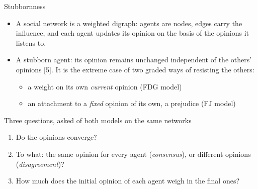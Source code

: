 \documentclass[10pt, aspectratio=169]{beamer}
\begin{document}
\begin{frame}[label=m-question]{Stubbornness}
  \begin{itemize}
    \item A social network is a weighted digraph: agents are nodes, edges carry the
          influence, and each agent updates its opinion on the basis of the opinions it
          listens to.
    \item A \alert{stubborn} agent: its opinion remains unchanged independent of the
          others' opinions [5]. It is the extreme case of two graded ways of resisting
          the others:
          \begin{itemize}
            \item a weight on its own \emph{current} opinion \hfill (FDG model)
            \item an attachment to a \emph{fixed} opinion of its own, a prejudice
                  \hfill (FJ model)
          \end{itemize}
  \end{itemize}
  \vspace{3mm}
  \begin{alertblock}{Three questions, asked of both models on the same networks}
    \begin{enumerate}
      \item Do the opinions converge?
      \item To what: the same opinion for every agent (\emph{consensus}), or different
            opinions (\emph{disagreement})?
      \item How much does the initial opinion of each agent weigh in the final ones?
    \end{enumerate}
  \end{alertblock}
\end{frame}
\end{document}
